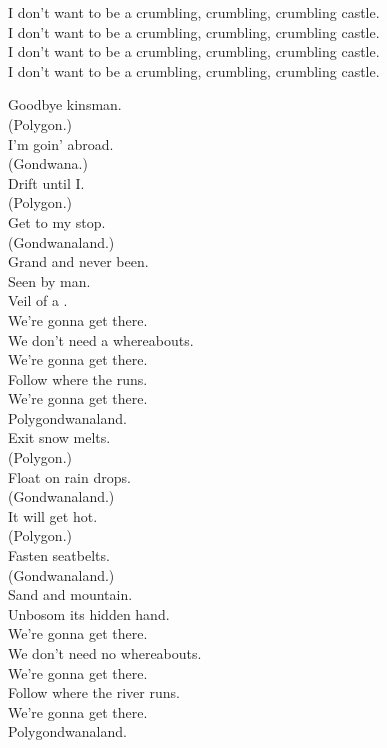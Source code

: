 I don't want to be a crumbling, crumbling, crumbling castle. \\
I don't want to be a crumbling, crumbling, crumbling castle. \\
I don't want to be a crumbling, crumbling, crumbling castle. \\
I don't want to be a crumbling, crumbling, crumbling castle. \\




Goodbye kinsman. \\
(Polygon.) \\
I'm goin' abroad. \\
(Gondwana.) \\
Drift until I. \\
(Polygon.) \\
Get to my stop. \\
(Gondwanaland.) \\
Grand and never been. \\
Seen by man. \\
Veil of a . \\

We're gonna get there. \\
We don't need a whereabouts. \\
We're gonna get there. \\
Follow where the  runs. \\
We're gonna get there. \\
Polygondwanaland. \\

Exit snow melts. \\
(Polygon.) \\
Float on rain drops. \\
(Gondwanaland.) \\
It will get hot. \\
(Polygon.) \\
Fasten seatbelts. \\
(Gondwanaland.) \\
Sand and mountain. \\
Unbosom its hidden hand. \\

We're gonna get there. \\
We don't need no whereabouts. \\
We're gonna get there. \\
Follow where the river runs. \\
We're gonna get there. \\
Polygondwanaland. \\

